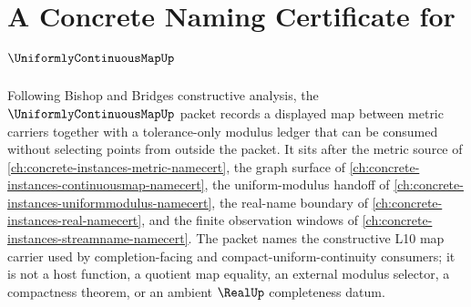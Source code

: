 \chapter{A Concrete Naming Certificate for $\UniformlyContinuousMapUp$}
\label{ch:concrete-instances-uniformly-continuous-map-namecert}

Following Bishop and Bridges constructive analysis, the $\UniformlyContinuousMapUp$ packet records a displayed map between metric carriers together with a tolerance-only modulus ledger that can be consumed without selecting points from outside the packet. It sits after the metric source of \autoref{ch:concrete-instances-metric-namecert}, the graph surface of \autoref{ch:concrete-instances-continuousmap-namecert}, the uniform-modulus handoff of \autoref{ch:concrete-instances-uniformmodulus-namecert}, the real-name boundary of \autoref{ch:concrete-instances-real-namecert}, and the finite observation windows of \autoref{ch:concrete-instances-streamname-namecert}. The packet names the constructive L10 map carrier used by completion-facing and compact-uniform-continuity consumers; it is not a host function, a quotient map equality, an external modulus selector, a compactness theorem, or an ambient $\RealUp$ completeness datum.

